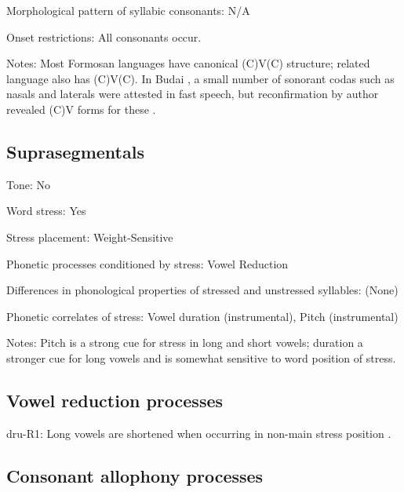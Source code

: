 {\begin{appendixdesc}
\item[Morphological pattern of syllabic consonants:] N/A

\item[Onset restrictions:] All consonants occur.

\item[Notes:] Most Formosan languages have canonical (C)V(C) structure; related language  also has (C)V(C). In Budai , a small number of sonorant codas such as nasals and laterals were attested in fast speech, but reconfirmation by author revealed (C)V forms for these \citep[213]{Chen2006}.
\end{appendixdesc}
\subsection*{Suprasegmentals}
\begin{appendixdesc}
\item[Tone:] No

\item[Word stress:] Yes

\item[Stress placement:] Weight-Sensitive

\item[Phonetic processes conditioned by stress:] Vowel Reduction

\item[Differences in phonological properties of stressed and unstressed syllables:] (None)

\item[Phonetic correlates of stress:] Vowel duration (instrumental), Pitch (instrumental)

\item[Notes:] Pitch is a strong cue for stress in long and short vowels; duration a stronger cue for long vowels and is somewhat sensitive to word position of stress.
\end{appendixdesc}
\subsection*{Vowel reduction processes}
\begin{appendixdesc}

\item[dru-R1:] Long vowels are shortened when occurring in non-main stress position \citep[257]{Chen2006}.
\end{appendixdesc}
\subsection*{Consonant allophony processes}
\begin{appendixdesc}


\end{appendixdesc}}
